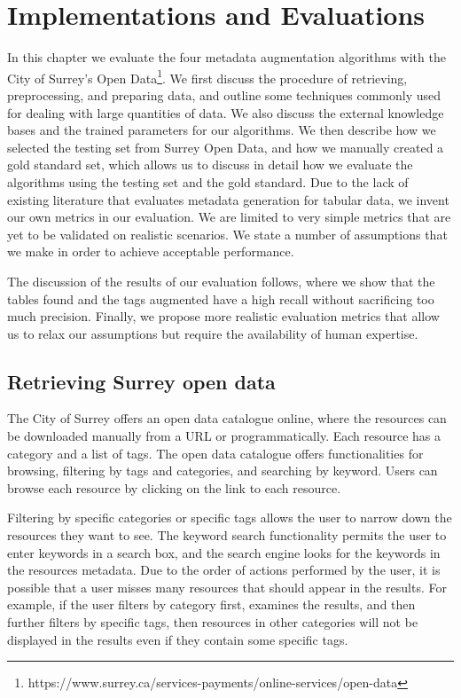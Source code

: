 
\chapter{Implementations and Evaluations}
\label{ch:Implementations}

In this chapter we evaluate the four metadata augmentation algorithms with the City of Surrey's Open Data\footnote{https://www.surrey.ca/services-payments/online-services/open-data}. We first discuss the procedure of retrieving, preprocessing, and preparing data, and outline some techniques commonly used for dealing with large quantities of data. We also discuss the external knowledge bases and the trained parameters for our algorithms. We then describe how we selected the testing set from Surrey Open Data, and how we manually created a gold standard set, which allows us to discuss in detail how we evaluate the algorithms using the testing set and the gold standard. Due to the lack of existing literature that evaluates metadata generation for tabular data, we invent our own metrics in our evaluation. We are limited to very simple metrics that are yet to be validated on realistic scenarios. We state a number of assumptions that we make in order to achieve acceptable performance.

The discussion of the results of our evaluation follows, where we show that the tables found and the tags augmented have a high recall without sacrificing too much precision. Finally, we propose more realistic evaluation metrics that allow us to relax our assumptions but require the availability of human expertise.

\section{Retrieving Surrey open data}
\label{sec:RetrievingSurreyOpenData}

The City of Surrey offers an open data catalogue online, where the resources can be downloaded manually from a URL or programmatically. Each resource has a category and a list of tags. The open data catalogue offers functionalities for browsing, filtering by tags and categories, and searching by keyword. Users can browse each resource by clicking on the link to each resource.

Filtering by specific categories or specific tags allows the user to narrow down the resources they want to see. The keyword search functionality permits the user to enter keywords in a search box, and the search engine looks for the keywords in the resources metadata. Due to the order of actions performed by the user, it is possible that a user misses many resources that should appear in the results. For example, if the user filters by category first, examines the results, and then further filters by specific tags, then resources in other categories will not be displayed in the results even if they contain some specific tags.

